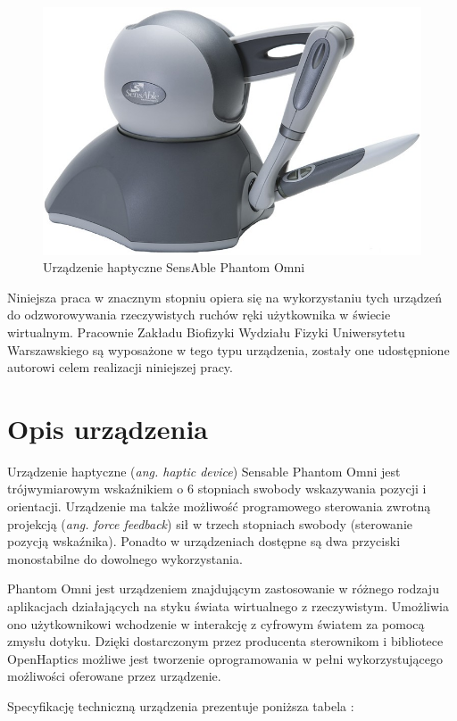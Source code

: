 \documentclass[licencjacka]{pracamgr}
\begin{document}
\begin{figure}[H]
\centering
\includegraphics[scale=0.5,center]{Sensable_Phantom_Omni}
\caption{Urządzenie haptyczne SensAble Phantom Omni}
\end{figure}

Niniejsza praca w znacznym stopniu opiera się na wykorzystaniu tych urządzeń do odzworowywania rzeczywistych ruchów ręki użytkownika w świecie wirtualnym. Pracownie Zakładu Biofizyki Wydziału Fizyki Uniwersytetu Warszawskiego są wyposażone w tego typu urządzenia, zostały one udostępnione autorowi celem realizacji niniejszej pracy.

\section{Opis urządzenia}
Urządzenie haptyczne (\textit{ang. haptic device}) Sensable Phantom Omni jest trójwymiarowym wskaźnikiem o 6 stopniach swobody wskazywania pozycji i orientacji. Urządzenie ma także możliwość programowego sterowania zwrotną projekcją (\textit{ang. force feedback}) sił w trzech stopniach swobody (sterowanie pozycją wskaźnika). Ponadto w urządzeniach dostępne są dwa przyciski monostabilne do dowolnego wykorzystania.

Phantom Omni jest urządzeniem znajdującym zastosowanie w różnego rodzaju aplikacjach działających na styku świata wirtualnego z rzeczywistym. Umożliwia ono użytkownikowi wchodzenie w interakcję z cyfrowym światem za pomocą zmysłu dotyku. Dzięki dostarczonym przez producenta sterownikom i bibliotece OpenHaptics możliwe jest tworzenie oprogramowania w pełni wykorzystującego możliwości oferowane przez urządzenie.

Specyfikację techniczną urządzenia prezentuje poniższa tabela \cite{geomagicTouchBrochure}:
\end{document}
